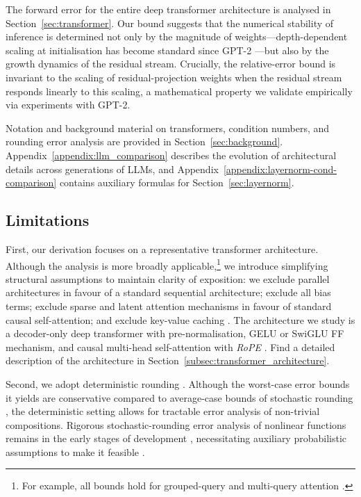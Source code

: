\documentclass[namedate,webpdf,imanum]{ima-authoring-template}
\numberwithin{equation}{section}
\begin{document}
The forward error for the entire deep transformer architecture is analysed in Section~\ref{sec:transformer}.
Our bound suggests that the numerical stability of inference is determined not only by the magnitude of weights---depth-dependent scaling at initialisation has become standard since GPT-2 \citep{radford2019language}---but also by the growth dynamics of the residual stream.
Crucially, the relative-error bound is invariant to the scaling of residual-projection weights when the residual stream responds linearly to this scaling, a mathematical property we validate empirically via experiments with GPT-2.

Notation and background material on transformers, condition numbers, and rounding error analysis are provided in Section~\ref{sec:background}.
Appendix~\ref{appendix:llm_comparison} describes the evolution of architectural details across generations of LLMs, and Appendix~\ref{appendix:layernorm-cond-comparison} contains auxiliary formulas for Section~\ref{sec:layernorm}.

\subsection{Limitations}
First, our derivation focuses on a representative transformer architecture.
Although the analysis is more broadly applicable,\footnote{For example, all bounds hold for grouped-query and multi-query attention \citep{shazeer2019fast, ainslie2023gqa}.} we introduce simplifying structural assumptions to maintain clarity of exposition: we exclude parallel architectures \citep{chowdhery2023palm, malartic2024falcon2} in favour of a standard sequential architecture; exclude all bias terms; exclude sparse \citep{beltagy2020longformer} and latent \citep{liu2024deepseek} attention mechanisms in favour of standard causal self-attention; and exclude key-value caching \citep{dai2019transformer}.
The architecture we study is a decoder-only deep transformer with pre-normalisation, GELU or SwiGLU FF mechanism, and causal multi-head self-attention with \emph{RoPE} \citep{su2024roformer}.
Find a detailed description of the architecture in Section~\ref{subsec:transformer_architecture}.

Second, we adopt deterministic rounding \citep{higham2002accuracy}.
Although the worst-case error bounds it yields are conservative compared to average-case bounds of stochastic rounding \citep{croci2022stochastic}, the deterministic setting allows for tractable error analysis of non-trivial compositions.
Rigorous stochastic-rounding error analysis of nonlinear functions remains in the early stages of development \citep{el2024bounds}, necessitating auxiliary probabilistic assumptions to make it feasible \citep{beuzeville2026deterministic}.
\end{document}
